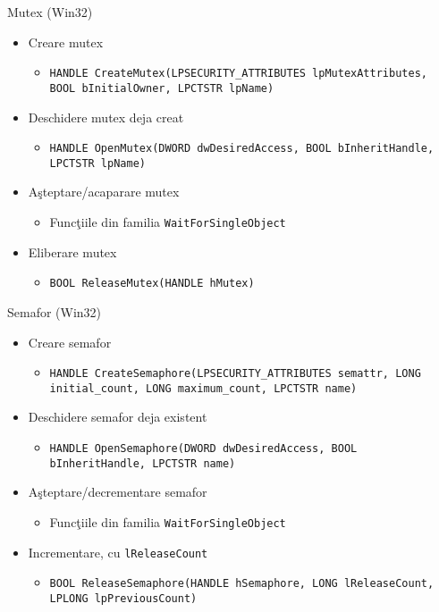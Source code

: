 \documentclass{so.cs.pub.ro}
\begin{document}
\begin{frame}{Mutex (Win32)}
	\begin{itemize}
		\item Creare mutex
			\begin{itemize}
				\item \texttt{HANDLE CreateMutex(LPSECURITY_ATTRIBUTES lpMutexAttributes, BOOL bInitialOwner, LPCTSTR lpName)}
			\end{itemize}
		\item Deschidere mutex deja creat
			\begin{itemize}
				\item \texttt{HANDLE OpenMutex(DWORD dwDesiredAccess, BOOL bInheritHandle, LPCTSTR lpName)}
			\end{itemize}
		\item Aşteptare/acaparare mutex
			\begin{itemize}
				\item Funcţiile din familia \texttt{WaitForSingleObject}
			\end{itemize}
		\item Eliberare mutex
			\begin{itemize}
				\item \texttt{BOOL ReleaseMutex(HANDLE hMutex)}
			\end{itemize}
	\end{itemize}
\end{frame}

\begin{frame}{Semafor (Win32)}
	\begin{itemize}
		\item Creare semafor
			\begin{itemize}
				\item \texttt{HANDLE CreateSemaphore(LPSECURITY_ATTRIBUTES semattr, LONG initial_count, LONG maximum_count, LPCTSTR name)}
			\end{itemize}
		\item Deschidere semafor deja existent
			\begin{itemize}
				\item \texttt{HANDLE OpenSemaphore(DWORD dwDesiredAccess, BOOL bInheritHandle, LPCTSTR name)}
			\end{itemize}
		\item Aşteptare/decrementare semafor
			\begin{itemize}
				\item Funcţiile din familia \texttt{WaitForSingleObject}
			\end{itemize}
		\item Incrementare, cu \texttt{lReleaseCount}
			\begin{itemize}
				\item \texttt{BOOL ReleaseSemaphore(HANDLE hSemaphore, LONG lReleaseCount, LPLONG lpPreviousCount)}
			\end{itemize}
	\end{itemize}
\end{frame}
\end{document}
